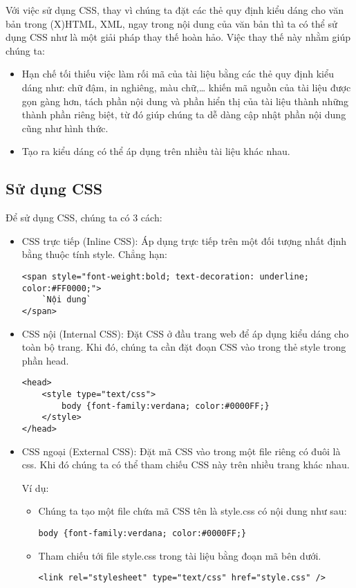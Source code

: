 Với việc sử dụng CSS, thay vì chúng ta đặt các thẻ quy định kiểu dáng cho văn bản trong (X)HTML, XML, ngay trong nội dung của văn bản thì ta có thể sử dụng CSS như là một giải pháp thay thế hoàn hảo. Việc thay thế này nhằm giúp chúng ta:
\begin{itemize}
\item	Hạn chế tối thiếu việc làm rối mã của tài liệu bằng các thẻ quy định kiểu dáng như: chữ đậm, in nghiêng, màu chữ,… khiến mã nguồn của tài liệu được gọn gàng hơn, tách phần nội dung và phần hiển thị của tài liệu thành những thành phần riêng biệt, từ đó giúp chúng ta dễ dàng cập nhật phần nội dung cũng như hình thức.
\item	Tạo ra kiểu dáng có thể áp dụng trên nhiều tài liệu khác nhau.
\end{itemize}
\subsection{Sử dụng CSS}
Để sử dụng CSS, chúng ta có 3 cách:
\begin{itemize}
\item	CSS trực tiếp (Inline CSS): Áp dụng trực tiếp trên một đối tượng nhất định bằng thuộc tính style. Chẳng hạn:
\lstset{language=XML}
\begin{lstlisting}[escapechar=`]
<span style="font-weight:bold; text-decoration: underline; color:#FF0000;">
	`Nội dung`
</span>
\end{lstlisting}
\item	CSS nội (Internal CSS): Đặt CSS ở đầu trang web để áp dụng kiểu dáng cho toàn bộ trang. Khi đó, chúng ta cần đặt đoạn CSS vào trong thẻ {\ttfamily style} trong phần {\ttfamily head}.
\lstset{language=XML}
\begin{lstlisting}[escapechar=`]
<head>
	<style type="text/css">
		body {font-family:verdana; color:#0000FF;} 
	</style>
</head>
\end{lstlisting}
\item	CSS ngoại (External CSS): Đặt mã CSS vào trong một file riêng có đuôi là css. Khi đó chúng ta có thể tham chiếu CSS này trên nhiều trang khác nhau.

Ví dụ:
\begin{itemize}


\item 	Chúng ta tạo một file chứa mã CSS tên là style.css có nội dung như sau:
\lstset{language=XML}
\begin{lstlisting}[escapechar=`]
body {font-family:verdana; color:#0000FF;}
\end{lstlisting}
\item 	Tham chiếu tới file style.css trong tài liệu bằng đoạn mã bên dưới.
\lstset{language=XML}
\begin{lstlisting}[escapechar=`]
<link rel="stylesheet" type="text/css" href="style.css" />
\end{lstlisting}
\end{itemize}
\end{itemize}

